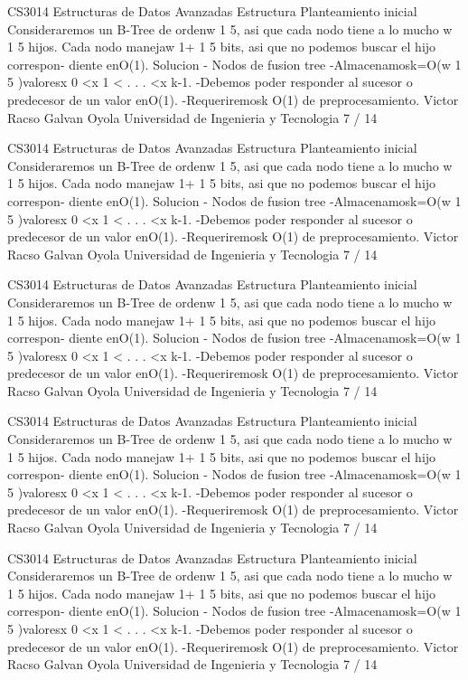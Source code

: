 \begin{description}[leftmargin=!,labelwidth=4.2em,style=nextline]
\item[Pag. 19] CS3014 Estructuras de Datos Avanzadas Estructura Planteamiento inicial Consideraremos un B-Tree de ordenw 1 5, asi que cada nodo tiene a lo mucho w 1 5 hijos. Cada nodo manejaw 1+ 1 5 bits, asi que no podemos buscar el hijo correspon- diente enO(1). Solucion - Nodos de fusion tree -Almacenamosk=O(w 1 5 )valoresx 0 <x 1 < . . . <x k-1. -Debemos poder responder al sucesor o predecesor de un valor enO(1). -Requeriremosk O(1) de preprocesamiento. Victor Racso Galvan Oyola Universidad de Ingenieria y Tecnologia 7 / 14
\item[Pag. 20] CS3014 Estructuras de Datos Avanzadas Estructura Planteamiento inicial Consideraremos un B-Tree de ordenw 1 5, asi que cada nodo tiene a lo mucho w 1 5 hijos. Cada nodo manejaw 1+ 1 5 bits, asi que no podemos buscar el hijo correspon- diente enO(1). Solucion - Nodos de fusion tree -Almacenamosk=O(w 1 5 )valoresx 0 <x 1 < . . . <x k-1. -Debemos poder responder al sucesor o predecesor de un valor enO(1). -Requeriremosk O(1) de preprocesamiento. Victor Racso Galvan Oyola Universidad de Ingenieria y Tecnologia 7 / 14
\item[Pag. 21] CS3014 Estructuras de Datos Avanzadas Estructura Planteamiento inicial Consideraremos un B-Tree de ordenw 1 5, asi que cada nodo tiene a lo mucho w 1 5 hijos. Cada nodo manejaw 1+ 1 5 bits, asi que no podemos buscar el hijo correspon- diente enO(1). Solucion - Nodos de fusion tree -Almacenamosk=O(w 1 5 )valoresx 0 <x 1 < . . . <x k-1. -Debemos poder responder al sucesor o predecesor de un valor enO(1). -Requeriremosk O(1) de preprocesamiento. Victor Racso Galvan Oyola Universidad de Ingenieria y Tecnologia 7 / 14
\item[Pag. 22] CS3014 Estructuras de Datos Avanzadas Estructura Planteamiento inicial Consideraremos un B-Tree de ordenw 1 5, asi que cada nodo tiene a lo mucho w 1 5 hijos. Cada nodo manejaw 1+ 1 5 bits, asi que no podemos buscar el hijo correspon- diente enO(1). Solucion - Nodos de fusion tree -Almacenamosk=O(w 1 5 )valoresx 0 <x 1 < . . . <x k-1. -Debemos poder responder al sucesor o predecesor de un valor enO(1). -Requeriremosk O(1) de preprocesamiento. Victor Racso Galvan Oyola Universidad de Ingenieria y Tecnologia 7 / 14
\item[Pag. 23] CS3014 Estructuras de Datos Avanzadas Estructura Planteamiento inicial Consideraremos un B-Tree de ordenw 1 5, asi que cada nodo tiene a lo mucho w 1 5 hijos. Cada nodo manejaw 1+ 1 5 bits, asi que no podemos buscar el hijo correspon- diente enO(1). Solucion - Nodos de fusion tree -Almacenamosk=O(w 1 5 )valoresx 0 <x 1 < . . . <x k-1. -Debemos poder responder al sucesor o predecesor de un valor enO(1). -Requeriremosk O(1) de preprocesamiento. Victor Racso Galvan Oyola Universidad de Ingenieria y Tecnologia 7 / 14

\end{description}
